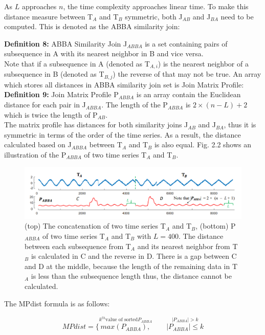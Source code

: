 As $L$ approaches $n$, the time complexity approaches linear time. To make this distance measure between T$_A$ and T$_B$ symmetric, both J$_{AB}$ and J$_{BA}$ need to be computed. This is denoted as the ABBA similarity join:

\textbf{Definition 8: } ABBA Similarity Join J$_{ABBA}$ is a set containing pairs of subsequence in A with its nearest neighbor in B and vice versa.\\
Note that if a subsequence in A (denoted as T$_{A,i}$) is the nearest neighbor of a subsequence in B (denoted as T$_{B,j}$) the reverse of that may not be true. An array which stores all distances in ABBA similarity join set is Join Matrix Profile:
\\
\textbf{Definition 9: }Join Matrix Profile P$_{ABBA}$ is an array contain the Euclidean distance for each pair in J$_{ABBA}$. The length of the P$_{ABBA}$ is $2 \times (n - L) + 2$ which is twice the length of P$_{AB}$.
\\
The  matrix profile has distances for both similarity joins J$_{AB}$ and J$_{BA}$, thus it is symmetric in terms of the order of the time series. As a result, the distance calculated based on J$_{ABBA}$ between T$_{A}$ and T$_{B}$ is also equal. Fig. 2.2 shows an illustration of the P$_{ABBA}$ of two time series T$_{A}$ and T$_{B}$.

\begin{figure}
\centering     
\includegraphics[width=1\textwidth]{Figures/MPdist_fig4.png}
\caption{(top) The concatenation of two time series T$_A$ and T$_B$, (bottom) P$_{ABBA}$ of two time series T$_A$ and T$_B$ with $L = 400$. The distance between each subsequence from T$_A$ and its nearest neighbor from T$_B$ is calculated in C and the reverse in D. There is a gap between C and D at the middle, because the length of the remaining data in T$_A$ is less than the subsequence length thus, the distance cannot be calculated.}
\label{fig:MPdist}
\end{figure} 

The MPdist formula is as follows:

\begin{equation}
MPdist = \Bigg\{ 
\stackrel 
    {k^{th} \textrm{value of sorted} P_{ABBA}}
    {max(P_{ABBA}),}
\qquad 
\stackrel
    {|P_{ABBA}| > k}
    {|P_{ABBA}| \leq k}
\end{equation}

